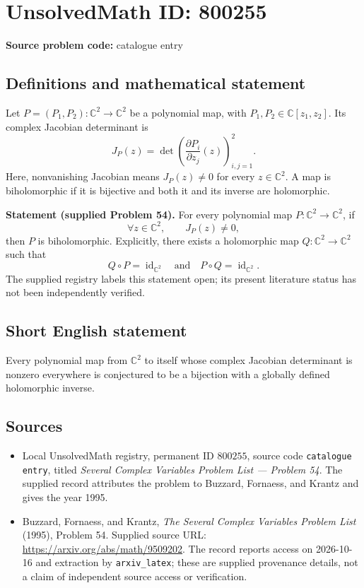 \documentclass[11pt]{article}
\newcommand{\C}{\mathbb{C}}
\begin{document}
\section*{UnsolvedMath ID: 800255}
\textbf{Source problem code:} catalogue entry
\subsection{Definitions and mathematical statement}
Let \(P=(P_1,P_2):\C^2\to\C^2\) be a polynomial map, with \(P_1,P_2\in\C[z_1,z_2]\). Its complex Jacobian determinant is
\[
J_P(z)=\det\left(\frac{\partial P_i}{\partial z_j}(z)\right)_{i,j=1}^{2}.
\]
Here, nonvanishing Jacobian means \(J_P(z)\ne0\) for every \(z\in\C^2\). A map is biholomorphic if it is bijective and both it and its inverse are holomorphic.

\textbf{Statement (supplied Problem 54).} For every polynomial map \(P:\C^2\to\C^2\), if
\[
\forall z\in\C^2,\qquad J_P(z)\ne0,
\]
then \(P\) is biholomorphic. Explicitly, there exists a holomorphic map \(Q:\C^2\to\C^2\) such that
\[
Q\circ P=\operatorname{id}_{\C^2}
\quad\text{and}\quad
P\circ Q=\operatorname{id}_{\C^2}.
\]
The supplied registry labels this statement open; its present literature status has not been independently verified.
\subsection{Short English statement}
Every polynomial map from \(\C^2\) to itself whose complex Jacobian determinant is nonzero everywhere is conjectured to be a bijection with a globally defined holomorphic inverse.
\subsection{Sources}
\begin{itemize}
\item Local UnsolvedMath registry, permanent ID \(800255\), source code \texttt{catalogue entry}, titled \emph{Several Complex Variables Problem List --- Problem 54}. The supplied record attributes the problem to Buzzard, Fornaess, and Krantz and gives the year 1995.
\item Buzzard, Fornaess, and Krantz, \emph{The Several Complex Variables Problem List} (1995), Problem 54. Supplied source URL: \url{https://arxiv.org/abs/math/9509202}. The record reports access on 2026-10-16 and extraction by \texttt{arxiv\_latex}; these are supplied provenance details, not a claim of independent source access or verification.
\end{itemize}
\end{document}
